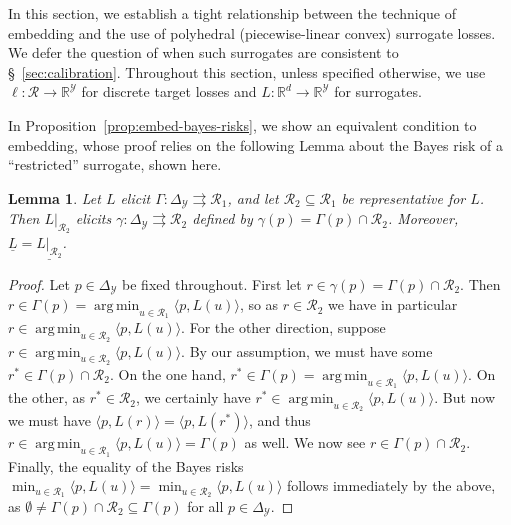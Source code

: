 \documentclass[11pt]{article}
\newcommand{\Comments}{1}
\newcommand{\mytodo}[2]{\ifnum\Comments=1%
  \todo[linecolor=#1!80!black,backgroundcolor=#1,bordercolor=#1!80!black]{#2}\fi}
\newcommand{\jessiet}[1]{\mytodo{teal!20!white}{JF: #1}}
\newcommand{\reals}{\mathbb{R}}
\newcommand{\simplex}{\Delta_\Y}
\newcommand{\R}{\mathcal{R}}
\newcommand{\Sc}{\mathcal{S}}
\newcommand{\Y}{\mathcal{Y}}
\newcommand{\risk}[1]{\underline{#1}}
\newcommand{\inprod}[2]{\langle #1, #2 \rangle}%
\newcommand{\inter}[1]{\mathring{#1}}%
\newcommand{\toto}{\rightrightarrows}
\DeclareMathOperator*{\argmin}{arg\,min}
\newtheorem{lemma}{Lemma}
\newtheorem{definition}{Definition}
\begin{document}
In this section, we establish a tight relationship between the technique of embedding and the use of polyhedral (piecewise-linear convex) surrogate losses.
We defer the question of when such surrogates are consistent to \S~\ref{sec:calibration}. 
Throughout this section, unless specified otherwise, we use $\ell:\R\to\reals^\Y$ for discrete target losses and $L:\reals^d\to\reals^\Y$ for surrogates.

In Proposition~\ref{prop:embed-bayes-risks}, we show an equivalent condition to embedding, whose proof relies on the following Lemma about the Bayes risk of a ``restricted'' surrogate, shown here.
\begin{lemma}\label{lem:loss-restrict}
  Let $L$ elicit $\Gamma:\simplex\toto\R_1$, and let $\R_2\subseteq\R_1$ be representative for $L$.
  Then $L|_{\R_2}$ elicits $\gamma:\simplex\toto\R_2$ defined by $\gamma(p) = \Gamma(p)\cap \R_2$.
  Moreover, $\risk{L}=\risk{L|_{\R_2}}$.
\end{lemma}
\begin{proof}
	Let $p\in\simplex$ be fixed throughout.
	First let $r \in \gamma(p) = \Gamma(p) \cap \R_2$.
	Then $r \in \Gamma(p) = \argmin_{u\in\R_1} \inprod{p}{L(u)}$, so as $r\in\R_2$ we have in particular $r \in \argmin_{u\in\R_2} \inprod{p}{L(u)}$.
	For the other direction, suppose $r \in \argmin_{u\in\R_2} \inprod{p}{L(u)}$.
	By our assumption, we must have some $r^* \in \Gamma(p) \cap \R_2$.
	On the one hand, $r^*\in\Gamma(p) = \argmin_{u\in\R_1} \inprod{p}{L(u)}$.
	On the other, as $r^* \in \R_2$, we certainly have $r^* \in \argmin_{u\in\R_2} \inprod{p}{L(u)}$.
	But now we must have $\inprod{p}{L(r)} = \inprod{p}{L(r^*)}$, and thus $r \in \argmin_{u\in\R_1} \inprod{p}{L(u)} = \Gamma(p)$ as well.
	We now see $r \in \Gamma(p) \cap \R_2$.
	Finally, the equality of the Bayes risks $\min_{u\in\R_1} \inprod{p}{L(u)} = \min_{u\in\R_2} \inprod{p}{L(u)}$ follows immediately by the above, as $\emptyset \neq \Gamma(p)\cap\R_2 \subseteq \Gamma(p)$ for all $p\in\simplex$.
\end{proof}


\end{document}
